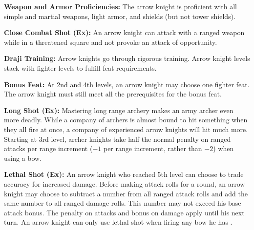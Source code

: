 {
\textbf{Weapon and Armor Proficiencies:} The arrow knight is proficient with all simple and martial weapons, light armor, and shields (but not tower shields).

\textbf{Close Combat Shot (Ex):} An arrow knight can attack with a ranged weapon while in a threatened square and not provoke an attack of opportunity.

\textbf{Draji Training:} Arrow knights go through rigorous training. Arrow knight levels stack with fighter levels to fulfill feat requirements.

\textbf{Bonus Feat:} At 2nd and 4th levels, an arrow knight may choose one fighter feat. The arrow knight must still meet all the prerequisites for the bonus feat.

\textbf{Long Shot (Ex):} Mastering long range archery makes an army archer even more deadly. While a company of archers is almost bound to hit something when they all fire at once, a company of experienced arrow knights will hit much more. Starting at 3rd level, archer knights take half the normal penalty on ranged attacks per range increment ($-1$ per range increment, rather than $-2$) when using a bow.

\textbf{Lethal Shot (Ex):} An arrow knight who reached 5th level can choose to trade accuracy for increased damage. Before making attack rolls for a round, an arrow knight may choose to subtract a number from all ranged attack rolls and add the same number to all ranged damage rolls. This number may not exceed his base attack bonus. The penalty on attacks and bonus on damage apply until his next turn. An arrow knight can only use lethal shot when firing any bow he has .
}

